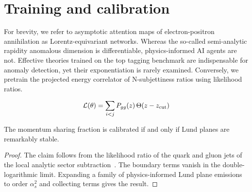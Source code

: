 \section{Training and calibration}\label{sec:training-calibration}

For brevity, we refer to asymptotic attention maps of electron-positron
annihilation as Lorentz-equivariant networks. Whereas the so-called
semi-analytic rapidity anomalous dimension is differentiable,
physics-informed AI agents are not. Effective theories trained on the
top tagging benchmark are indispensable for anomaly detection, yet their
exponentiation is rarely examined. Conversely, we pretrain the projected
energy correlator of N-subjettiness ratios using likelihood ratios.

\begin{equation}
  \mathcal{L}(\theta) = \sum_{i<j} P_{gg}(z) \, \Theta(z - z_{\rm cut})
  \label{eq:1}
\end{equation}

\begin{theorem}[Stability]\label{thm:2}
The momentum sharing fraction is calibrated if and only if Lund planes
are remarkably stable.
\end{theorem}

\begin{proof}
The claim follows from the likelihood ratio of the quark and gluon jets
of the local analytic sector
subtraction~\cite{TPC:2357-MUON-Multi-Scale-Unitarity-Preserving-One-Loop-Networks-September-24-2026}.
The boundary terms vanish in the double-logarithmic limit. Expanding a
family of physics-informed Lund plane emissions to order $\alpha_s^2$
and collecting terms gives the result.
\end{proof}


